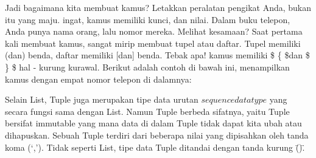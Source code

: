 Jadi bagaimana kita membuat kamus? Letakkan peralatan pengikat Anda, bukan itu yang maju. ingat, kamus memiliki kunci, dan nilai. Dalam buku telepon, Anda punya nama orang, lalu nomor mereka. Melihat kesamaan? Saat pertama kali membuat kamus, sangat mirip membuat tupel atau daftar. Tupel memiliki (dan) benda, daftar memiliki [dan] benda. Tebak apa! kamus memiliki \$  \{  \$dan \$  \}  \$ hal - kurung kurawal. Berikut adalah contoh di bawah ini, menampilkan kamus dengan empat nomor telepon di dalamnya: 

Selain List, Tuple juga merupakan tipe data urutan \(sequence data type\) yang secara fungsi sama dengan List. Namun Tuple berbeda sifatnya, yaitu Tuple bersifat immutable yang mana data di dalam Tuple tidak dapat kita ubah atau dihapuskan. Sebuah Tuple terdiri dari beberapa nilai yang dipisahkan oleh tanda koma (‘,’). Tidak seperti List, tipe data Tuple ditandai dengan tanda kurung \"()\".
